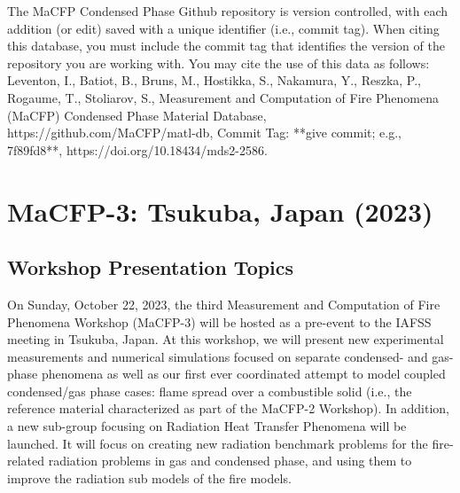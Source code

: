 \documentclass[12pt]{article}
\begin{document}
The MaCFP Condensed Phase Github repository is version controlled, with each addition (or edit) saved with a unique identifier (i.e., commit tag). When citing this database, you must include the commit tag that identifies the version of the repository you are working with. You may cite the use of this data as follows:\\ 
Leventon, I., Batiot, B., Bruns, M., Hostikka, S., Nakamura, Y., Reszka, P., Rogaume, T., Stoliarov, S., Measurement and Computation of Fire Phenomena (MaCFP) Condensed Phase Material Database, https://github.com/MaCFP/matl-db, Commit Tag: **give commit; e.g., 7f89fd8**, https://doi.org/10.18434/mds2-2586.

\section{MaCFP-3: Tsukuba, Japan (2023)}
\label{Sec:MaCFP-3}
\subsection{Workshop Presentation Topics}
\label{Sec:MaCFP-3 Target Cases}
On Sunday, October 22, 2023, the third Measurement and Computation of Fire Phenomena Workshop (MaCFP-3) will be hosted as a pre-event to the IAFSS meeting in Tsukuba, Japan. At this workshop, we will present new experimental measurements and numerical simulations focused on separate condensed- and gas-phase phenomena as well as our first ever coordinated attempt to model coupled condensed/gas phase cases: flame spread over a combustible solid (i.e., the reference material characterized as part of the MaCFP-2 Workshop). In addition, a new sub-group focusing on Radiation Heat Transfer Phenomena will be launched. It will focus on creating new radiation benchmark problems for the fire-related radiation problems in gas and condensed phase, and using them to improve the radiation sub models of the fire models.
\end{document}
